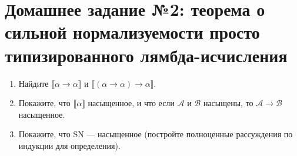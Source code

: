 \documentclass[10pt,a4paper,oneside]{article}
\begin{document}
\section*{Домашнее задание №2: теорема о сильной нормализуемости просто типизированного лямбда-исчисления}

\begin{enumerate}
\item Найдите $\llbracket\alpha\rightarrow\alpha\rrbracket$ и $\llbracket(\alpha\rightarrow\alpha)\rightarrow\alpha\rrbracket$.
\item Покажите, что $\llbracket\alpha\rrbracket$ насыщенное, 
и что если $\mathcal{A}$ и $\mathcal{B}$ насыщены, то $\mathcal{A}\rightarrow\mathcal{B}$ насыщенное.
\item Покажите, что SN --- насыщенное (постройте полноценные рассуждения по индукции для определения).
\end{enumerate}
\end{document}
